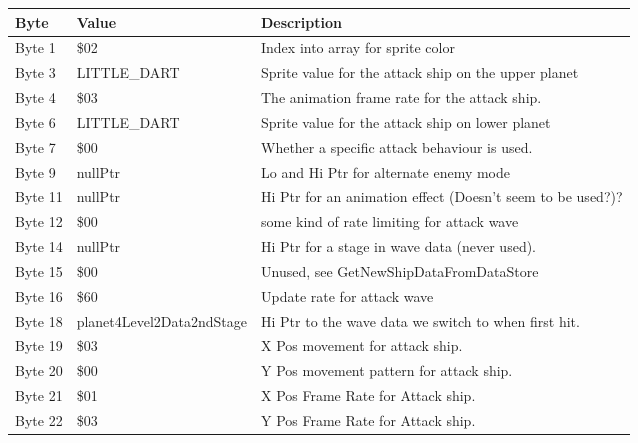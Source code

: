 \begin{figure}[H]
{\begin{adjustbox}{width=12cm}
\begin{tabular}{lll}
\toprule
 Byte    & Value                     & Description                                                        \\
\midrule
 Byte 1  & \$02                       & Index into array for sprite color                                  \\
 Byte 3  & LITTLE\_DART               & Sprite value for the attack ship on the upper planet               \\
 Byte 4  & \$03                       & The animation frame rate for the attack ship.                      \\
 Byte 6  & LITTLE\_DART               & Sprite value for the attack ship on lower planet                   \\
 Byte 7  & \$00                       & Whether a specific attack behaviour is used.                       \\
 Byte 9  & nullPtr                   & Lo and Hi Ptr for alternate enemy mode                             \\
 Byte 11 & nullPtr                   & Hi Ptr for an animation effect (Doesn't seem to be used?)?         \\
 Byte 12 & \$00                       & some kind of rate limiting for attack wave                         \\
 Byte 14 & nullPtr                   & Hi Ptr for a stage in wave data (never used).                      \\
 Byte 15 & \$00                       & Unused, see GetNewShipDataFromDataStore                            \\
 Byte 16 & \$60                       & Update rate for attack wave                                        \\
 Byte 18 & planet4Level2Data2ndStage & Hi Ptr to the wave data we switch to when first hit.               \\
 Byte 19 & \$03                       & X Pos movement for attack ship.                                    \\
 Byte 20 & \$00                       & Y Pos movement pattern for attack ship.                            \\
 Byte 21 & \$01                       & X Pos Frame Rate for Attack ship.                                  \\
 Byte 22 & \$03                       & Y Pos Frame Rate for Attack ship.                                  \\

\end{tabular}
\end{adjustbox}}
\end{figure}
